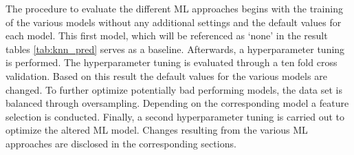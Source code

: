 The procedure to evaluate the different ML approaches begins with the training of the various models without any additional settings and the default values for each model. This first model, which will be referenced as \enquote*{none} in the result tables \ref{tab:knn_pred} serves as a baseline. Afterwards, a hyperparameter tuning is performed. The hyperparameter tuning is evaluated through a ten fold cross validation. Based on this result the default values for the various models are changed. To further optimize potentially bad performing models, the data set is balanced through oversampling. Depending on the corresponding model a feature selection is conducted. Finally, a second hyperparameter tuning is carried out to optimize the altered ML model. Changes resulting from the various ML approaches are disclosed in the corresponding sections.


